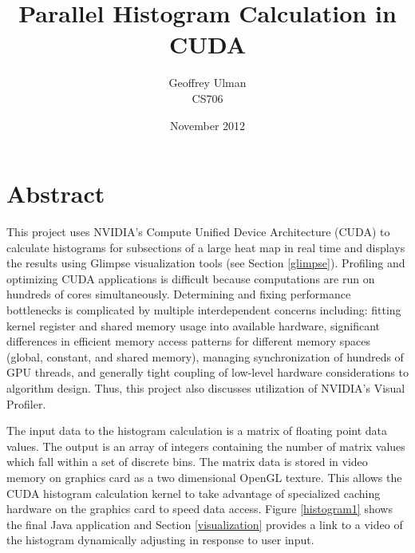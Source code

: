 \documentclass{article}
\begin{document}
\title{Parallel Histogram Calculation in CUDA}
\author{Geoffrey Ulman\\
        CS706}
\date{November 2012}
\maketitle

\section{Abstract}\label{abstract}

This project uses NVIDIA's Compute Unified Device Architecture\cite{cuda-zone} (CUDA) to calculate histograms for subsections of a large heat map in real time and displays the results using Glimpse visualization tools (see Section \ref{glimpse}). Profiling and optimizing CUDA applications is difficult because computations are run on hundreds of cores simultaneously. Determining and fixing performance bottlenecks is complicated by multiple interdependent concerns including: fitting kernel register and shared memory usage into available hardware, significant differences in efficient memory access patterns for different memory spaces (global, constant, and shared memory), managing synchronization of hundreds of GPU threads, and generally tight coupling of low-level hardware considerations to algorithm design. Thus, this project also discusses utilization of NVIDIA's Visual Profiler\cite{nvidia-visual-profiler}.

The input data to the histogram calculation is a matrix of floating point data values. The output is an array of integers containing the number of matrix values which fall within a set of discrete bins. The matrix data is stored in video memory on graphics card as a two dimensional OpenGL texture. This allows the CUDA histogram calculation kernel to take advantage of specialized caching hardware on the graphics card to speed data access. Figure \ref{histogram1} shows the final Java application and Section \ref{visualization} provides a link to a video of the histogram dynamically adjusting in response to user input.
\end{document}
